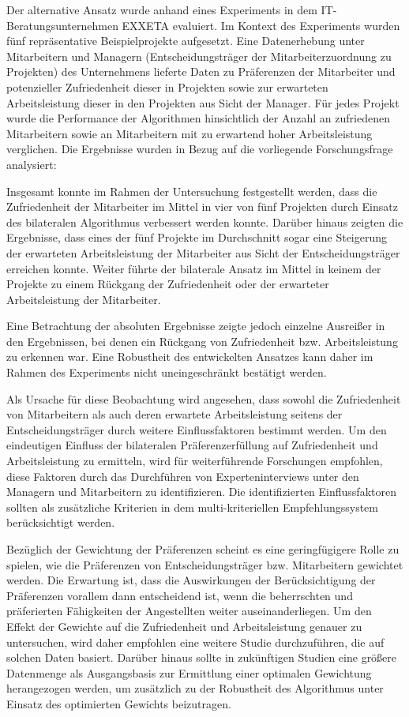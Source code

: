 Der alternative Ansatz wurde anhand eines Experiments in dem IT-Bera\-tungsunternehmen EXXETA evaluiert.
Im Kontext des Experiments wurden fünf repräsentative Beispielprojekte aufgesetzt.
Eine Datenerhebung unter Mitarbeitern und Managern (Entscheidungsträger der Mitarbeiterzuordnung zu Projekten) des Unternehmens lieferte Daten zu Präferenzen der Mitarbeiter und potenzieller Zufriedenheit dieser in Projekten sowie zur erwarteten Arbeitsleistung dieser in den Projekten aus Sicht der Manager.
Für jedes Projekt wurde die Performance der Algorithmen hinsichtlich der Anzahl an zufriedenen Mitarbeitern sowie an Mitarbeitern mit zu erwartend hoher Arbeitsleistung verglichen.
Die Ergebnisse wurden in Bezug auf die vorliegende Forschungsfrage analysiert:
\forschungsfrage

Insgesamt konnte im Rahmen der Untersuchung festgestellt werden, dass die Zufriedenheit der Mitarbeiter im Mittel in vier von fünf Projekten durch Einsatz des bilateralen Algorithmus verbessert werden konnte.
Darüber hinaus zeigten die Ergebnisse, dass eines der fünf Projekte im Durchschnitt sogar eine Steigerung der erwarteten Arbeitsleistung der Mitarbeiter aus Sicht der Entscheidungsträger erreichen konnte.
Weiter führte der bilaterale Ansatz im Mittel in keinem der Projekte zu einem Rückgang der Zufriedenheit oder der erwarteter Arbeitsleistung der Mitarbeiter.

Eine Betrachtung der absoluten Ergebnisse zeigte jedoch einzelne Ausreißer in den Ergebnissen, bei denen ein Rückgang von Zufriedenheit bzw. Arbeitsleistung zu erkennen war.
Eine Robustheit des entwickelten Ansatzes kann daher im Rahmen des Experiments nicht uneingeschränkt bestätigt werden.

Als Ursache für diese Beobachtung wird angesehen, dass sowohl die Zufriedenheit von Mitarbeitern als auch deren erwartete Arbeitsleistung seitens der Entscheidungsträger durch weitere Einflussfaktoren bestimmt werden.
Um den eindeutigen Einfluss der bilateralen Präferenzerfüllung auf Zufriedenheit und Arbeitsleistung zu ermitteln, wird für weiterführende Forschungen empfohlen, diese Faktoren durch das Durchführen von Experteninterviews unter den Managern und Mitarbeitern zu identifizieren.
Die identifizierten Einflussfaktoren sollten als zusätzliche Kriterien in dem multi-kriteriellen Empfehlungssystem berücksichtigt werden.

Bezüglich der Gewichtung der Präferenzen scheint es eine geringfügigere Rolle zu spielen, wie die Präferenzen von Entscheidungsträger bzw. Mitarbeitern gewichtet werden.
Die Erwartung ist, dass die Auswirkungen der Berücksichtigung der Präferenzen vorallem dann entscheidend ist, wenn die beherrschten und präferierten Fähigkeiten der Angestellten weiter auseinanderliegen.
Um den Effekt der Gewichte auf die Zufriedenheit und Arbeitsleistung genauer zu untersuchen, wird daher empfohlen eine weitere Studie durchzuführen, die auf solchen Daten basiert.
Darüber hinaus sollte in zukünftigen Studien eine größere Datenmenge als Ausgangsbasis zur Ermittlung einer optimalen Gewichtung herangezogen werden, um zusätzlich zu der Robustheit des Algorithmus unter Einsatz des optimierten Gewichts beizutragen.

